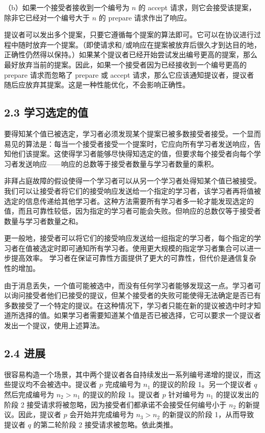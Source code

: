 \documentclass[12pt,a4paper]{report} %
\begin{document}
（b）如果一个接受者接收到一个编号为 $n$ 的 accept 请求，则它会接受该提案，除非它已经对一个编号大于 $n$ 的 prepare 请求作出了响应。

提议者可以发出多个提案，只要它遵循每个提案的算法即可。它可以在协议进行过程中随时放弃一个提案。（即使请求和/或响应在提案被放弃后很久才到达目的地，正确性仍然得以保持。）如果某个提议者已经开始尝试发出编号更高的提案，那么最好放弃当前的提案。因此，如果一个接受者因为已经接收到一个编号更高的 prepare 请求而忽略了 prepare 或 accept 请求，那么它应该通知提议者，提议者随后应放弃其提案。这是一种性能优化，不会影响正确性。

\subsection*{2.3 学习选定的值}

要得知某个值已被选定，学习者必须发现某个提案已被多数接受者接受。一个显而易见的算法是：每当一个接受者接受一个提案时，它应向所有学习者发送响应，告知他们该提案。这使得学习者能够尽快得知选定的值，但要求每个接受者向每个学习者发送响应——响应的总数等于接受者数量与学习者数量的乘积。

非拜占庭故障的假设使得一个学习者可以从另一个学习者处得知某个值已被接受。我们可以让接受者将它们的接受响应发送给一个指定的学习者，该学习者再将值被选定的信息传递给其他学习者。这种方法需要所有学习者多一轮才能发现选定的值，而且可靠性较低，因为指定的学习者可能会失败。但响应的总数仅等于接受者数量与学习者数量之和。

更一般地，接受者可以将它们的接受响应发送给一组指定的学习者，每个指定的学习者在值被选定时即可通知所有学习者。使用更大规模的指定学习者集合可以进一步提高效率。
学习者在保证可靠性方面提供了更大的可靠性，但代价是通信复杂性的增加。

由于消息丢失，一个值可能被选中，而没有任何学习者能够发现这一点。学习者可以询问接受者他们已接受的提议，但某个接受者的失败可能使得无法确定是否已有多数接受了一个特定的提议。在这种情况下，学习者只能在新的提议被选中时才知道所选择的值。如果学习者需要知道某个值是否已被选择，它可以要求一个提议者发出一个提议，使用上述算法。

\subsection*{2.4 进展}

很容易构造一个场景，其中两个提议者各自持续发出一系列编号递增的提议，而这些提议均不会被选中。提议者 $p$ 完成编号为 $n_{1}$ 的提议的阶段 1。另一个提议者 $q$ 然后完成编号为 $n_{2}>n_{1}$ 的提议的阶段 1。提议者 $p$ 针对编号为 $n_{1}$ 的提议发出的阶段 2 接受请求将被忽略，因为接受者们都承诺不会接受任何编号小于 $n_{2}$ 的新提议。因此，提议者 $p$ 会开始并完成编号为 $n_{3}>n_{2}$ 的新提议的阶段 1，从而导致提议者 $q$ 的第二轮阶段 2 接受请求被忽略。依此类推。
\end{document}
